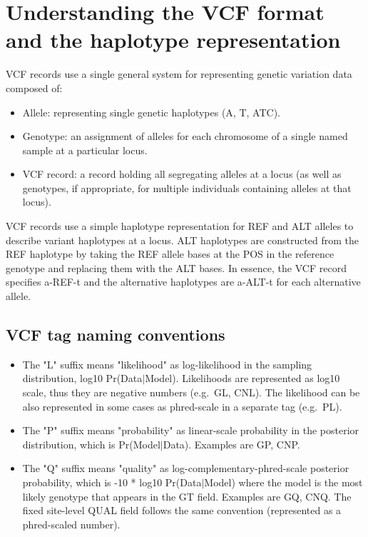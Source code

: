 \documentclass[8pt]{article}
\begin{document}
\section{Understanding the VCF format and the haplotype representation}
VCF records use a single general system for representing genetic variation data composed of:
\begin{itemize}
  \item Allele: representing single genetic haplotypes (A, T, ATC).
  \item Genotype: an assignment of alleles for each chromosome of a single named sample at a particular locus.
  \item VCF record: a record holding all segregating alleles at a locus (as well as genotypes, if appropriate, for multiple individuals containing alleles at that locus).
\end{itemize}
VCF records use a simple haplotype representation for REF and ALT alleles to describe variant haplotypes at a locus. ALT haplotypes are constructed from the REF haplotype by taking the REF allele bases at the POS in the reference genotype and replacing them with the ALT bases. In essence, the VCF record specifies a-REF-t and the alternative haplotypes are a-ALT-t for each alternative allele.

\subsection{VCF tag naming conventions}
\begin{itemize}
    \item The "L" suffix means "likelihood" as log-likelihood in the sampling
    distribution, log10 Pr(Data$|$Model).  Likelihoods are represented as log10
    scale, thus they are negative numbers (e.g.~GL, CNL).  The likelihood can be also
    represented in some cases as phred-scale in a separate tag (e.g.~PL).

    \item The "P" suffix means "probability" as linear-scale probability in the
    posterior distribution, which is Pr(Model$|$Data).  Examples are GP, CNP.

    \item The "Q" suffix means "quality" as log-complementary-phred-scale posterior
    probability, which is -10 * log10 Pr(Data$|$Model) where the model is the most
    likely genotype that appears in the GT field.  Examples are GQ, CNQ.  The fixed
    site-level QUAL field follows the same convention (represented as a
    phred-scaled number).
\end{itemize}
\end{document}
